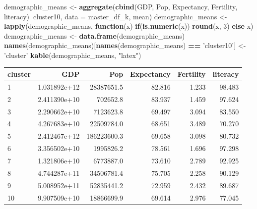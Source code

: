 \documentclass[]{article}
\newenvironment{Shaded}{\begin{snugshade}}{\end{snugshade}}
\newcommand{\ControlFlowTok}[1]{\textcolor[rgb]{0.13,0.29,0.53}{\textbf{#1}}}
\newcommand{\DataTypeTok}[1]{\textcolor[rgb]{0.13,0.29,0.53}{#1}}
\newcommand{\DecValTok}[1]{\textcolor[rgb]{0.00,0.00,0.81}{#1}}
\newcommand{\KeywordTok}[1]{\textcolor[rgb]{0.13,0.29,0.53}{\textbf{#1}}}
\newcommand{\NormalTok}[1]{#1}
\newcommand{\OperatorTok}[1]{\textcolor[rgb]{0.81,0.36,0.00}{\textbf{#1}}}
\newcommand{\StringTok}[1]{\textcolor[rgb]{0.31,0.60,0.02}{#1}}
\begin{document}
\begin{Shaded}
\begin{Highlighting}[]
\NormalTok{demographic_means <-}\StringTok{ }\KeywordTok{aggregate}\NormalTok{(}\KeywordTok{cbind}\NormalTok{(GDP, Pop, Expectancy, Fertility, literacy)}\OperatorTok{~}\NormalTok{cluster10, }
                               \DataTypeTok{data =}\NormalTok{ master_df_k, mean)}
\NormalTok{demographic_means <-}\StringTok{ }\KeywordTok{lapply}\NormalTok{(demographic_means, }\ControlFlowTok{function}\NormalTok{(x) }\ControlFlowTok{if}\NormalTok{(}\KeywordTok{is.numeric}\NormalTok{(x)) }\KeywordTok{round}\NormalTok{(x, }\DecValTok{3}\NormalTok{) }\ControlFlowTok{else}\NormalTok{ x)}
\NormalTok{demographic_means <-}\StringTok{ }\KeywordTok{data.frame}\NormalTok{(demographic_means)}
\KeywordTok{names}\NormalTok{(demographic_means)[}\KeywordTok{names}\NormalTok{(demographic_means) }\OperatorTok{==}\StringTok{ 'cluster10'}\NormalTok{] <-}\StringTok{ 'cluster'}
\KeywordTok{kable}\NormalTok{(demographic_means, }\StringTok{"latex"}\NormalTok{)}
\end{Highlighting}
\end{Shaded}

\begin{tabular}{l|r|r|r|r|r}
\hline
cluster & GDP & Pop & Expectancy & Fertility & literacy\\
\hline
1 & 1.031892e+12 & 28387651.5 & 82.816 & 1.233 & 98.483\\
\hline
2 & 2.411390e+10 & 702652.8 & 83.937 & 1.459 & 97.624\\
\hline
3 & 2.290662e+10 & 7123623.8 & 69.497 & 3.094 & 83.550\\
\hline
4 & 4.267683e+10 & 22509784.0 & 68.651 & 3.489 & 70.270\\
\hline
5 & 2.412467e+12 & 186223600.3 & 69.658 & 3.098 & 80.732\\
\hline
6 & 3.356502e+10 & 1995826.2 & 78.561 & 1.696 & 97.298\\
\hline
7 & 1.321806e+10 & 6773887.0 & 73.610 & 2.789 & 92.925\\
\hline
8 & 4.744287e+11 & 34506781.4 & 75.705 & 2.258 & 90.129\\
\hline
9 & 5.008952e+11 & 52835441.2 & 72.959 & 2.432 & 89.687\\
\hline
10 & 9.907509e+10 & 18866699.9 & 69.614 & 2.976 & 77.045\\
\hline
\end{tabular}
\end{document}
